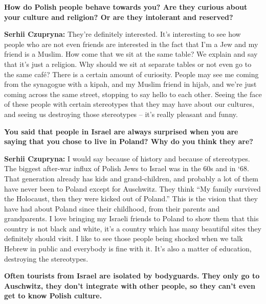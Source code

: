 \textbf{How do Polish people behave towards you? Are they curious about your culture and religion? Or are they intolerant and reserved?}\par
\textbf{Serhii Czupryna:} They’re definitely interested. It’s interesting to see how people who are not even friends are interested in the fact that I’m a Jew and my friend is a Muslim. How come that we sit at the same table? We explain and say that it’s just a religion. Why should we sit at separate tables or not even go to the same café? There is a certain amount of curiosity. People may see me coming from the synagogue with a kipah, and my Muslim friend in hijab, and we’re just coming across the same street, stopping to say hello to each other. Seeing the face of these people with certain stereotypes that they may have about our cultures, and seeing us destroying those stereotypes – it’s really pleasant and funny.\par 
\textbf{You said that people in Israel are always surprised when you are saying that you chose to live in Poland? Why do you think they are?}\par
\textbf{Serhii Czupryna:} I would say because of history and because of stereotypes. The biggest after-war influx of Polish Jews to Israel was in the 60s and in ‘68. That generation already has kids and grand-children, and probably a lot of them have never been to Poland except for Auschwitz. They think ``My family survived the Holocaust, then they were kicked out of Poland.'' This is the vision that they have had about Poland since their childhood, from their parents and grandparents. I love bringing my Israeli friends to Poland to show them that this country is not black and white, it’s a country which has many beautiful sites they definitely should visit. I like to see those people being shocked when we talk Hebrew in public and everybody is fine with it. It’s also a matter of education, destroying the stereotypes.\par
\sloppy
\textbf{Often tourists from Israel are isolated by bodyguards. They only go to Auschwitz,  they don’t integrate with other people, so they can’t even get to know Polish culture.}\par
